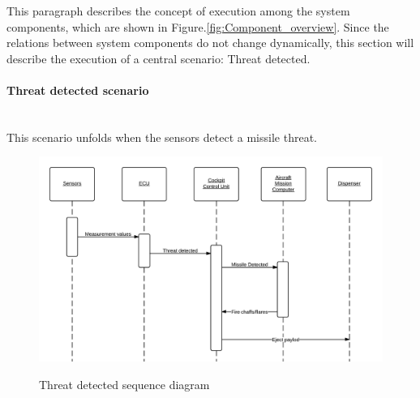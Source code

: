 This paragraph describes the concept of execution among the system components, which are shown in Figure.\ref{fig:Component_overview}. Since the relations between system 
components do not change dynamically, this section will describe the execution of a central scenario: Threat detected.

\paragraph{Threat detected scenario}\mbox{}\\
This scenario unfolds when the sensors detect a missile threat.



\begin{figure}[h]
	\centering
	\includegraphics[scale=0.2]{./images/threatDetectedSequenceDiagram.png}\\
	\caption{Threat detected sequence diagram}
    \label{fig:threatDetectedSeqDia}
\end{figure}